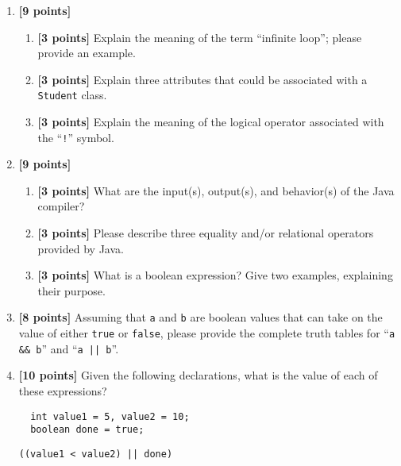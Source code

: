 \begin{enumerate}
\item {\bf [9 points]}
\begin{enumerate}
\item {\bf [3 points]} 
Explain the meaning of the term ``infinite loop''; please provide an example.
\bigskip
\bigskip
\bigskip
\item {\bf [3 points]} 
Explain three attributes that could be associated with a {\tt Student} class.
\bigskip
\bigskip
\bigskip
\item {\bf [3 points]} 
  Explain the meaning of the logical operator associated with the ``{\tt !}'' symbol.
\bigskip
\bigskip
\bigskip
\bigskip
\end{enumerate}
\item {\bf [9 points]}
\begin{enumerate}
\item {\bf [3 points]} 
  What are the input(s), output(s), and behavior(s) of the Java compiler?
\bigskip
\bigskip
\bigskip
\bigskip
\item {\bf [3 points]} 
Please describe three equality and/or relational operators provided by Java.
\bigskip
\bigskip
\bigskip
\bigskip
\item {\bf [3 points]} 
What is a boolean expression? Give two examples, explaining their purpose.
\end{enumerate}
\bigskip
\bigskip
\bigskip
\bigskip

\item {\bf [8 points]}
  Assuming that {\tt a} and {\tt b} are boolean values that can take on the value of either {\tt true} or {\tt false},
  please provide the complete truth tables for ``{\tt a \&\& b}'' and ``{\tt a || b}''.

\vspace{1.2in}

\item {\bf[10 points]} Given the following declarations, what is the value of each of these expressions?

  \begin{verbatim}
  int value1 = 5, value2 = 10;
  boolean done = true;
  \end{verbatim}

  \vspace*{-.35in}
  
\begin{verbatim}
((value1 < value2) || done)
\end{verbatim}


\end{enumerate}
